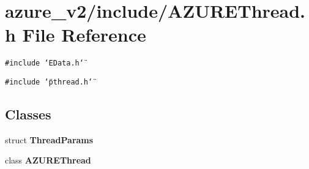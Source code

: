 \section{azure\_\-v2/include/AZUREThread.h File Reference}
\label{AZUREThread_8h}
{\tt \#include \char`\"{}EData.h\char`\"{}}\par
{\tt \#include \char`\"{}pthread.h\char`\"{}}\par
\subsection*{Classes}
\begin{CompactItemize}
\item 
struct \bf{Thread\-Params}
\item 
class \bf{AZUREThread}
\end{CompactItemize}
